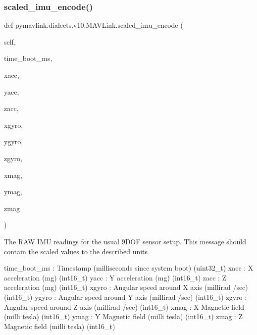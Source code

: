 \begin{DoxyVerb}
\begin{DoxyVerb}
\begin{DoxyVerb}
\begin{DoxyVerb}
\begin{DoxyVerb}
\begin{DoxyVerb}
\begin{DoxyVerb}
\begin{DoxyVerb}
\begin{DoxyVerb}
\begin{DoxyVerb}
\subsubsection{\texorpdfstring{scaled\+\_\+imu\+\_\+encode()}{scaled\_imu\_encode()}}
{\footnotesize\ttfamily def pymavlink.\+dialects.\+v10.\+M\+A\+V\+Link.\+scaled\+\_\+imu\+\_\+encode (\begin{DoxyParamCaption}\item[{}]{self,  }\item[{}]{time\+\_\+boot\+\_\+ms,  }\item[{}]{xacc,  }\item[{}]{yacc,  }\item[{}]{zacc,  }\item[{}]{xgyro,  }\item[{}]{ygyro,  }\item[{}]{zgyro,  }\item[{}]{xmag,  }\item[{}]{ymag,  }\item[{}]{zmag }\end{DoxyParamCaption})}

\begin{DoxyVerb}The RAW IMU readings for the usual 9DOF sensor setup. This message
should contain the scaled values to the described
units

time_boot_ms              : Timestamp (milliseconds since system boot) (uint32_t)
xacc                      : X acceleration (mg) (int16_t)
yacc                      : Y acceleration (mg) (int16_t)
zacc                      : Z acceleration (mg) (int16_t)
xgyro                     : Angular speed around X axis (millirad /sec) (int16_t)
ygyro                     : Angular speed around Y axis (millirad /sec) (int16_t)
zgyro                     : Angular speed around Z axis (millirad /sec) (int16_t)
xmag                      : X Magnetic field (milli tesla) (int16_t)
ymag                      : Y Magnetic field (milli tesla) (int16_t)
zmag                      : Z Magnetic field (milli tesla) (int16_t)\end{DoxyVerb}
 \mbox{\label{classpymavlink_1_1dialects_1_1v10_1_1MAVLink_ae93f5f8c404d88f45f232290bb128dac}} 

\end{DoxyVerb}
\end{DoxyVerb}
\end{DoxyVerb}
\end{DoxyVerb}
\end{DoxyVerb}
\end{DoxyVerb}
\end{DoxyVerb}
\end{DoxyVerb}
\end{DoxyVerb}
\end{DoxyVerb}
